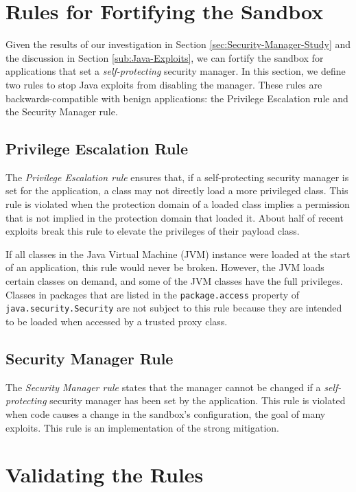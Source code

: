 \documentclass{sig-alternate}
\begin{document}
\section{Rules for Fortifying the Sandbox}\label{sec:Rules-for-Fortifying}

Given the results of our investigation in Section \ref{sec:Security-Manager-Study}
and the discussion in Section \ref{sub:Java-Exploits}, we can fortify
the sandbox for applications that set a\emph{ self-protecting} security
manager. In this section, we define two rules to stop Java exploits
from disabling the manager. These rules are backwards-compatible with
benign applications: the Privilege Escalation rule and the Security
Manager rule. 

\subsection{Privilege Escalation Rule}

The \textit{Privilege Escalation rule} ensures that, if a self-protecting
security manager is set for the application, a class may not directly
load a more privileged class. This rule is violated when the protection
domain of a loaded class implies a permission that is not implied
in the protection domain that loaded it. About half of recent exploits
break this rule to elevate the privileges of their payload class.

If all classes in the Java Virtual Machine (JVM) instance were loaded
at the start of an application, this rule would never be broken. However,
the JVM loads certain classes on demand, and some of the JVM classes
have the full privileges. Classes in
packages that are listed in the \texttt{package.access} property of
\texttt{java.security.Security} are not subject to this rule because they are intended to be
loaded when accessed by a trusted proxy class. 

\subsection{Security Manager Rule}

The \textit{Security Manager rule} states that the manager cannot
be changed if a \emph{self-protecting} security manager has been set
by the application. This rule is violated when code causes a change
in the sandbox's configuration, the goal of many exploits. This rule
is an implementation of the strong mitigation.

\section{Validating the Rules}\label{sec:Mitigations}
\end{document}

